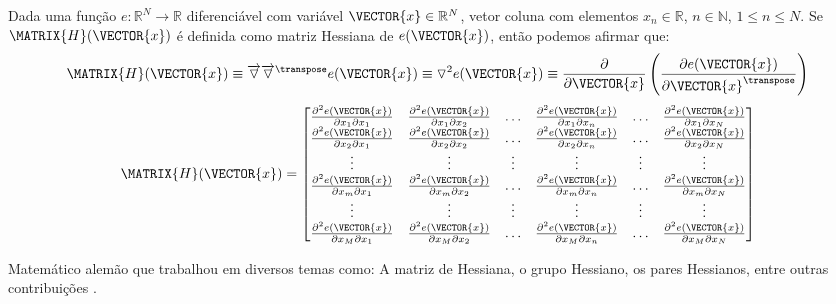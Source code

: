 \begin{proposition}\label{def:hessian}
 Dada uma função $e:\mathbb{R}^{N}\rightarrow \mathbb{R}$ diferenciável com variável $\VECTOR{x} \in \mathbb{R}^{N}$,
 vetor coluna  com elementos $x_n\in \mathbb{R}$, $n\in \mathbb{N}$, $1 \leq n \leq N$.
 Se $\MATRIX{H}(\VECTOR{x})$ é definida como matriz Hessiana \cite[pp. 150]{zhang2017matrix} \cite{Hessian} 
 de $e(\VECTOR{x})$, então podemos afirmar que: 
\begin{equation}
  \MATRIX{H}(\VECTOR{x}) \equiv  \overrightarrow{\triangledown} \overrightarrow{\triangledown}^{\transpose}e(\VECTOR{x}) \equiv  
\triangledown^2 e(\VECTOR{x}) \equiv \frac{\partial }{\partial \VECTOR{x}} \left( \frac{\partial e(\VECTOR{x})}{ \partial \VECTOR{x}^{\transpose} }\right) 
\end{equation}
 \begin{equation}
  \MATRIX{H}(\VECTOR{x}) =
\left[
\begin{matrix}
\frac{\partial^2 e(\VECTOR{x}) }{\partial x_{1}\partial x_{1}}&
\frac{\partial^2 e(\VECTOR{x}) }{\partial x_{1}\partial x_{2}}&
\hdots&
\frac{\partial^2 e(\VECTOR{x}) }{\partial x_{1}\partial x_{n}}&
\hdots&
\frac{\partial^2 e(\VECTOR{x}) }{\partial x_{1}\partial x_{N}}\\
\frac{\partial^2 e(\VECTOR{x}) }{\partial x_{2}\partial x_{1}}&
\frac{\partial^2 e(\VECTOR{x}) }{\partial x_{2}\partial x_{2}}&
\hdots&
\frac{\partial^2 e(\VECTOR{x}) }{\partial x_{2}\partial x_{n}}&
\hdots&
\frac{\partial^2 e(\VECTOR{x}) }{\partial x_{2}\partial x_{N}}\\
\vdots&
\vdots&
\vdots&
\vdots&
\vdots&
\vdots\\
\frac{\partial^2 e(\VECTOR{x}) }{\partial x_{m}\partial x_{1}}&
\frac{\partial^2 e(\VECTOR{x}) }{\partial x_{m}\partial x_{2}}&
\hdots&
\frac{\partial^2 e(\VECTOR{x}) }{\partial x_{m}\partial x_{n}}&
\hdots&
\frac{\partial^2 e(\VECTOR{x}) }{\partial x_{m}\partial x_{N}}\\
\vdots&
\vdots&
\vdots&
\vdots&
\vdots&
\vdots\\
\frac{\partial^2 e(\VECTOR{x}) }{\partial x_{M}\partial x_{1}}&
\frac{\partial^2 e(\VECTOR{x}) }{\partial x_{M}\partial x_{2}}&
\hdots&
\frac{\partial^2 e(\VECTOR{x}) }{\partial x_{M}\partial x_{n}}&
\hdots&
\frac{\partial^2 e(\VECTOR{x}) }{\partial x_{M}\partial x_{N}}\\
\end{matrix}
\right]
 \end{equation}
\end{proposition}

\begin{elaboracion}[title=Ludwig Otto Hesse (1811-1874), width= 0.99\linewidth]
Matemático alemão que trabalhou em diversos temas como: A matriz de Hessiana, 
o grupo Hessiano, os pares Hessianos, entre outras contribuições \cite[pp. 261]{agarwal2014creators}.
\end{elaboracion}
